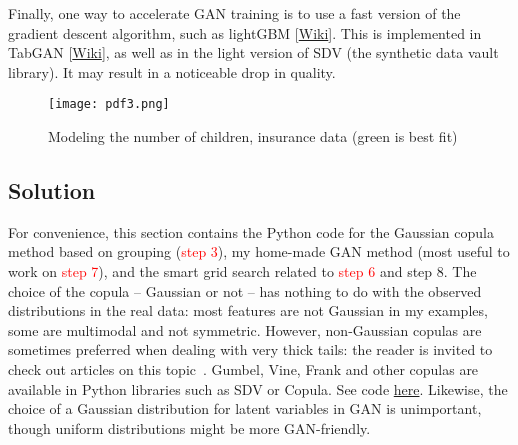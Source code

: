 \documentclass[oneside,10pt]{book}
\begin{document}
Finally, one way to accelerate GAN training is to use a fast version of the gradient descent algorithm, such as 
\textcolor{index}{lightGBM} [\href{https://en.wikipedia.org/wiki/LightGBM}{Wiki}]. This is implemented 
in \textcolor{index}{TabGAN} [\href{https://github.com/Diyago/GAN-for-tabular-data}{Wiki}],
as well as in the 
 light version of \textcolor{index}{SDV} (the synthetic data vault library). It may result in a noticeable drop in quality.

\begin{figure}[H]
\centering
\texttt{[image: pdf3.png]}   
\caption{Modeling the number of children, insurance data (green is best fit)}
\label{fig:gretfg1009}
\end{figure}

\subsection{Solution}\label{pureas}

For convenience, this section contains the Python code for the Gaussian copula method based on grouping (\textcolor{red}{step 3}), my home-made GAN method
 (most useful to work on \textcolor{red}{step 7}), and the smart grid search related to \textcolor{red}{step 6} and \textcolor{index}{step 8}. The choice of the copula -- Gaussian or not -- has nothing to do with the observed distributions in the real data: most features are not Gaussian in my examples, some are multimodal and not symmetric. 
However, non-Gaussian copulas are sometimes preferred when dealing with very thick tails: the reader is invited to check out articles 
on this topic~\cite{copul22eg}. 
Gumbel, Vine, Frank and other copulas are available in Python libraries such as \textcolor{index}{SDV} or \textcolor{index}{Copula}.
 See code \href{https://github.com/VincentGranville/Main/blob/main/copula.py}{here}.  Likewise, the choice of a Gaussian distribution
 for latent variables in GAN is unimportant, though uniform distributions might be more GAN-friendly.
\end{document}
